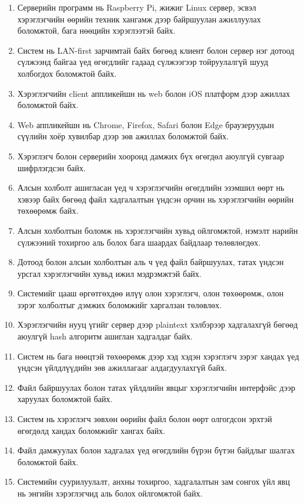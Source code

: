 \begin{enumerate}

\item Серверийн программ нь Raspberry Pi, жижиг Linux сервер, эсвэл хэрэглэгчийн өөрийн техник хангамж дээр байршуулан ажиллуулах боломжтой, бага нөөцийн хэрэглээтэй байх.

\item Систем нь LAN-first зарчимтай байх бөгөөд клиент болон сервер нэг дотоод сүлжээнд байгаа үед өгөгдлийг гадаад сүлжээгээр тойруулалгүй шууд холбогдох боломжтой байх.

\item Хэрэглэгчийн client аппликейшн нь web болон iOS платформ дээр ажиллах боломжтой байх.

\item Web аппликейшн нь Chrome, Firefox, Safari болон Edge браузеруудын сүүлийн хоёр хувилбар дээр зөв ажиллах боломжтой байх.

\item Хэрэглэгч болон серверийн хооронд дамжих бүх өгөгдөл аюулгүй сувгаар шифрлэгдсэн байх.

\item Алсын холболт ашигласан үед ч хэрэглэгчийн өгөгдлийн эзэмшил өөрт нь хэвээр байх бөгөөд файл хадгалалтын үндсэн орчин нь хэрэглэгчийн өөрийн төхөөрөмж байх.

\item Алсын холболтын боломж нь хэрэглэгчийн хувьд ойлгомжтой, нэмэлт нарийн сүлжээний тохиргоо аль болох бага шаардах байдлаар төлөвлөгдөх.

\item Дотоод болон алсын холболтын аль ч үед файл байршуулах, татах үндсэн урсгал хэрэглэгчийн хувьд ижил мэдрэмжтэй байх.

\item Системийг цааш өргөтгөхдөө илүү олон хэрэглэгч, олон төхөөрөмж, олон зэрэг холболтыг дэмжих боломжийг харгалзан төлөвлөх.

\item Хэрэглэгчийн нууц үгийг сервер дээр plaintext хэлбэрээр хадгалахгүй бөгөөд аюулгүй hash алгоритм ашиглан хадгалдаг байх.

\item Систем нь бага нөөцтэй төхөөрөмж дээр хэд хэдэн хэрэглэгч зэрэг хандах үед үндсэн үйлдлүүдийн зөв ажиллагааг алдагдуулахгүй байх.

\item Файл байршуулах болон татах үйлдлийн явцыг хэрэглэгчийн интерфэйс дээр харуулах боломжтой байх.

\item Систем нь хэрэглэгч зөвхөн өөрийн файл болон өөрт олгогдсон эрхтэй өгөгдөлд хандах боломжийг хангах байх.

\item Файл дамжуулах болон хадгалах үед өгөгдлийн бүрэн бүтэн байдлыг шалгах боломжтой байх.

\item Системийн суурилуулалт, анхны тохиргоо, хадгалалтын зам сонгох үйл явц нь энгийн хэрэглэгчид аль болох ойлгомжтой байх.

\end{enumerate}

